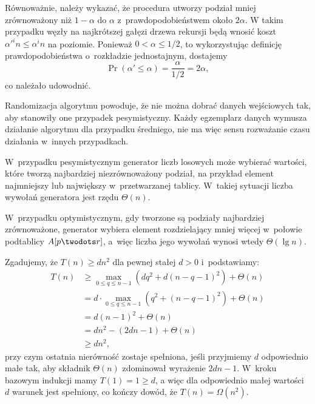 \exercise %
Równoważnie, należy wykazać, że procedura  utworzy podział mniej zrównoważony niż $1-\alpha$ do $\alpha$ z~prawdopodobieństwem około $2\alpha$. W takim przypadku węzły na najkrótszej gałęzi drzewa rekursji będą wnosić koszt $\alpha'^in\le\alpha^in$ na  poziomie. Ponieważ $0<\alpha\le1/2$, to wykorzystując definicję prawdopodobieństwa o~rozkładzie jednostajnym, dostajemy
\[
	\Pr(\alpha'\le\alpha) = \frac{\alpha}{1/2} = 2\alpha,
\]
co należało udowodnić.


\exercise %
Randomizacja algorytmu powoduje, że nie można dobrać danych wejściowych tak, aby stanowiły one przypadek pesymistyczny. Każdy egzemplarz danych wymusza działanie algorytmu dla przypadku średniego, nie ma więc sensu rozważanie czasu działania w~innych przypadkach.

\exercise %
W~przypadku pesymistycznym generator liczb losowych może wybierać wartości, które tworzą najbardziej niezrównoważony podział, na przykład element najmniejszy lub największy w~przetwarzanej tablicy. W~takiej sytuacji liczba wywołań generatora jest rzędu $\Theta(n)$.

W~przypadku optymistycznym, gdy tworzone są podziały najbardziej zrównoważone, generator wybiera element rozdzielający mniej więcej w~połowie podtablicy $A[p\twodots r]$, a~więc liczba jego wywołań wynosi wtedy $\Theta(\lg n)$.


\exercise %
Zgadujemy, że $T(n)\ge dn^2$ dla pewnej stałej $d>0$ i~podstawiamy:
\begin{align*}
	T(n) &\ge \max_{0\le q\le n-1}(dq^2+d(n-q-1)^2)+\Theta(n) \\
	&= d\cdot\max_{0\le q\le n-1}(q^2+(n-q-1)^2)+\Theta(n) \\
	&= d(n-1)^2+\Theta(n) \\
	&= dn^2-(2dn-1)+\Theta(n) \\
	&\ge dn^2,
\end{align*}
przy czym ostatnia nierówność zostaje spełniona, jeśli przyjmiemy $d$ odpowiednio małe tak, aby składnik $\Theta(n)$ zdominował wyrażenie $2dn-1$. W~kroku bazowym indukcji mamy $T(1)=1\ge d$, a więc dla odpowiednio małej wartości $d$ warunek jest spełniony, co kończy dowód, że $T(n)=\Omega(n^2)$.

